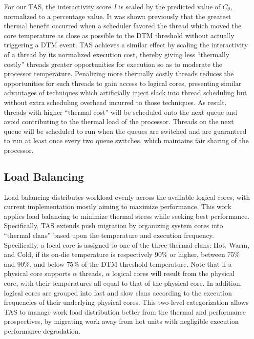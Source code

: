 \documentclass[times, 10pt,twocolumn]{IEEEtran}
\begin{document}
For our TAS, the interactivity score $I$ is scaled by the predicted
value of $C_{\theta}$, normalized to a percentage value.  It was shown
previously \cite{Zhou2010b} that the greatest thermal benefit occurred
when a scheduler favored the thread which moved the core temperature as
close as possible to the DTM threshold without actually triggering a DTM
event.  TAS achieves a similar effect by scaling the interactivity of a
thread by its normalized execution cost, thereby giving less ``thermally
costly'' threads greater opportunities for execution so as to moderate
the processor temperature.  Penalizing more thermally costly threads
reduces the opportunities for such threads to gain access to logical
cores, presenting similar advantages of techniques which artificially
inject slack into thread scheduling but without extra scheduling
overhead incurred to those techniques.  As result, threads  with higher ``thermal
cost'' will be scheduled onto the next queue and avoid contributing to
the thermal load of the processor.   Threads on the next queue will be
scheduled to run when the queues are switched and are guaranteed to run
at least once every two queue switches, which maintains fair sharing of
the processor.

\subsection{Load Balancing}
\label{sec:loadbalance} 
Load balancing distributes workload evenly across the available logical
cores, with current implementation mostly aiming to maximize
performance.  This work applies load balancing to minimize thermal
stress while seeking best performance.  Specifically, TAS extends push
migration by organizing system cores into ``thermal clans'' based upon
the temperature and execution frequency.  Specifically, a local core is
assigned to one of the three thermal clans: Hot, Warm, and Cold, if its
on-die temperature is respectively 90\% or higher, between 75\% and
90\%, and below 75\% of the DTM threshold temperature.  Note that if a
physical core supports $\alpha$ threads, $\alpha$ logical cores will
result from the physical core, with their temperatures all equal to that
of the physical core.  In addition, logical cores are grouped into fast
and slow clans according to the execution frequencies of their
underlying physical cores.  This two-level categorization allows TAS to
manage work load distribution better from the thermal and performance
prospectives, by migrating work away from hot units with negligible
execution performance degradation.
\end{document}
